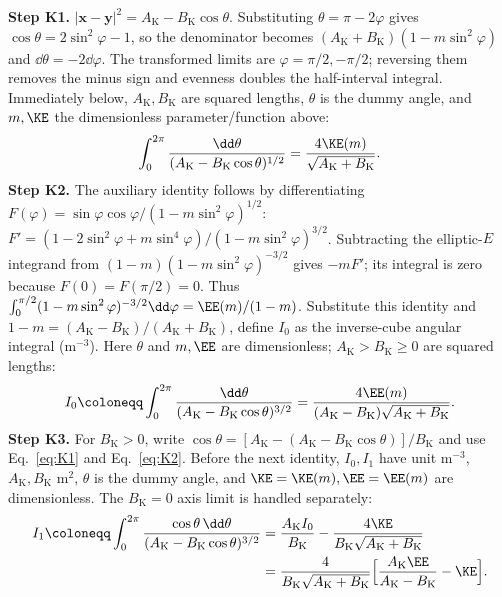 \textbf{Step K1.} $|\mathbf x-\mathbf y|^2=A_{\mathrm K}-B_{\mathrm K}\cos\theta$.
Substituting $\theta=\pi-2\varphi$ gives $\cos\theta=2\sin^2\varphi-1$, so the denominator becomes
$(A_{\mathrm K}+B_{\mathrm K})(1-m\sin^2\varphi)$ and $\dd\theta=-2\dd\varphi$.
The transformed limits are $\varphi=\pi/2,-\pi/2$; reversing them removes the minus sign and
evenness doubles the half-interval integral. Immediately below, $A_{\mathrm K},B_{\mathrm K}$
are squared lengths, $\theta$ is the dummy angle, and $m,\KE$ the dimensionless parameter/function above:
\begin{equation}
\int_0^{2\pi}\frac{\dd\theta}{(A_{\mathrm K}-B_{\mathrm K}\cos\theta)^{1/2}}
=\frac{4\KE(m)}{\sqrt{A_{\mathrm K}+B_{\mathrm K}}} .\label{eq:K1}
\end{equation}
\textbf{Step K2.} The auxiliary identity follows by differentiating
$F(\varphi)=\sin\varphi\cos\varphi/(1-m\sin^2\varphi)^{1/2}$:
$F'=(1-2\sin^2\varphi+m\sin^4\varphi)/(1-m\sin^2\varphi)^{3/2}$.
Subtracting the elliptic-$E$ integrand from $(1-m)(1-m\sin^2\varphi)^{-3/2}$ gives $-mF'$;
its integral is zero because $F(0)=F(\pi/2)=0$. Thus
$\int_0^{\pi/2}(1-m\sin^2\varphi)^{-3/2}\dd\varphi=\EE(m)/(1-m)$.
Substitute this identity
and $1-m=(A_{\mathrm K}-B_{\mathrm K})/(A_{\mathrm K}+B_{\mathrm K})$, define
$I_0$ as the inverse-cube angular integral (m$^{-3}$). Here $\theta$ and $m,\EE$ are
dimensionless; $A_{\mathrm K}>B_{\mathrm K}\ge0$ are squared lengths:
\begin{equation}
I_0\coloneqq\int_0^{2\pi}\frac{\dd\theta}{(A_{\mathrm K}-B_{\mathrm K}\cos\theta)^{3/2}}
=\frac{4\EE(m)}{(A_{\mathrm K}-B_{\mathrm K})\sqrt{A_{\mathrm K}+B_{\mathrm K}}} .\label{eq:K2}
\end{equation}
\textbf{Step K3.} For $B_{\mathrm K}>0$, write
$\cos\theta=[A_{\mathrm K}-(A_{\mathrm K}-B_{\mathrm K}\cos\theta)]/B_{\mathrm K}$ and use
Eq.~\eqref{eq:K1} and Eq.~\eqref{eq:K2}. Before the next identity,
$I_0,I_1$ have unit m$^{-3}$, $A_{\mathrm K},B_{\mathrm K}$ m$^2$, $\theta$ is the dummy angle,
and $\KE=\KE(m),\EE=\EE(m)$ are dimensionless. The $B_{\mathrm K}=0$ axis limit is handled separately:
\begin{align}
I_1\coloneqq\int_0^{2\pi}\frac{\cos\theta\,\dd\theta}
{(A_{\mathrm K}-B_{\mathrm K}\cos\theta)^{3/2}}
&=\frac{A_{\mathrm K}I_0}{B_{\mathrm K}}-\frac{4\KE}{B_{\mathrm K}\sqrt{A_{\mathrm K}+B_{\mathrm K}}}\notag\\
&=\frac{4}{B_{\mathrm K}\sqrt{A_{\mathrm K}+B_{\mathrm K}}}
\Bigl[\frac{A_{\mathrm K}\EE}{A_{\mathrm K}-B_{\mathrm K}}-\KE\Bigr].\label{eq:K3}
\end{align}
